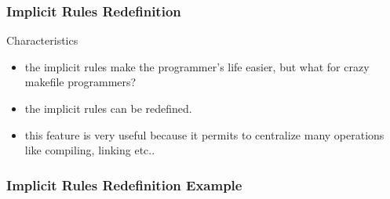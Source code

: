 \documentclass{beamer}
\begin{document}

\begin{frame}
  \frametitle{Implicit Rules Redefinition}

  \begin{block}{Characteristics}
    \begin{itemize}
      \item
        the implicit rules make the programmer's life easier, but what
        for crazy makefile programmers?
      \item
        the implicit rules can be redefined.
      \item
        this feature is very useful because it permits to centralize
        many operations like compiling, linking etc..
    \end{itemize}
  \end{block}

\end{frame}


\begin{frame}
  \frametitle{Implicit Rules Redefinition Example}

  \begin{columns}

    \column{7cm}
      \begin{Example}
        
      \end{Example}

    \column{4cm}
      \begin{Example}
        
      \end{Example}

  \end{columns}

\end{frame}
\end{document}
